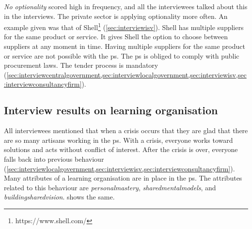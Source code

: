 \textit{No \gls{optionality}} scored high in frequency, and all the interviewees talked about this in the interviews. The private sector is applying optionality more often. An example given was that of Shell\footnote{https://www.shell.com/} (\cref{sec:interviewisv}). Shell has multiple suppliers for the same product or service. It gives Shell the option to choose between suppliers at any moment in time. Having multiple suppliers for the same product or service are not possible with the \gls{ps}. The \gls{ps} is obliged to comply with public procurement laws. The tender process is mandatory (\cref{sec:interviewcentralgovernment,sec:interviewlocalgovernment,sec:interviewisv,sec:interviewconsultancyfirm}).
\subsection{Interview results on learning organisation}
\label{sub:interviewresultslearning}
All interviewees mentioned that when a crisis occurs that they are glad that there are so many artisans working in the \gls{ps}. With a crisis, everyone works toward solutions and acts without conflict of interest. After the crisis is over, everyone falls back into previous behaviour (\cref{sec:interviewlocalgovernment,sec:interviewisv,sec:interviewconsultancyfirm}). Many \glspl{attribute} of a learning organisation are in place in the \gls{ps}. The \glspl{attribute} related to this behaviour are \textit{\gls{personalmastery}}, \textit{\gls{sharedmentalmodels}}, and \textit{\gls{buildingsharedvision}}.  shows the same.

